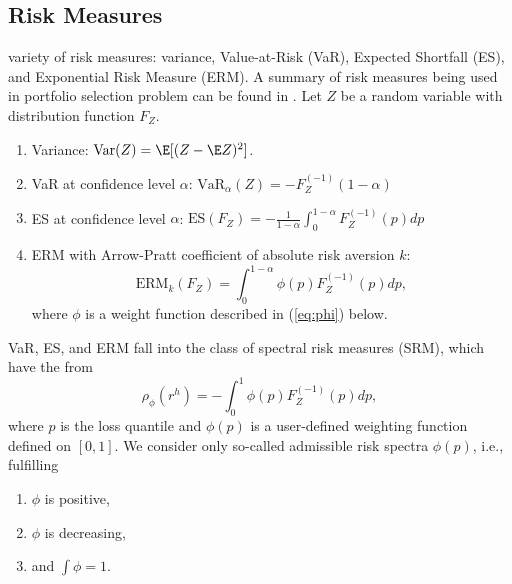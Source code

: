 \subsection{Risk Measures}\label{subsec:spectral-risk-measures}

 variety of risk measures: variance, Value-at-Risk (VaR), Expected Shortfall (ES), and Exponential Risk Measure (ERM).
A summary of risk measures being used in portfolio selection problem
can be found in \citet{hardle2008applied}.
 Let $Z$ be a random
variable with distribution function $F_Z$.
\begin{enumerate}
\item Variance: $\text{Var}(Z) = \E[(Z-\E Z)^2]$. 
\item VaR at confidence level $\alpha$: $\text{VaR}_\alpha(Z) = -F_{Z}^{(-1)}(1-\alpha)$
\item ES at confidence level $\alpha$: $\text{ES}(F_Z) = -\frac{1}{1-\alpha}\int_0^{1-\alpha}F_Z^{(-1)}(p)dp$
\item ERM with Arrow-Pratt coefficient of absolute risk
  aversion $k$:
  \begin{equation*}
    \text{ERM}_k(F_Z) = \int_0^{1-\alpha}\phi(p) F_Z^{(-1)}(p)dp,
  \end{equation*}
  where $\phi$ is a weight function described in (\ref{eq:phi}) below.
\end{enumerate}

VaR, ES, and ERM fall into the class of spectral risk measures (SRM),
which have the from \citep{Acerbi2002}%
\begin{equation*}
  \rho_\phi(r^h) = - \int_0^1 \phi(p) F_{Z}^{(-1)}(p)d p,
\end{equation*}
where $p$ is the loss quantile and $\phi(p)$ is a user-defined
weighting function defined on $[0,1]$.
We consider only so-called admissible risk spectra $\phi(p)$, i.e.,
fulfilling %
\begin{enumerate}[label=(\roman*)]
\item $\phi$ is positive,
\item $\phi$ is decreasing,
\item and $\int\phi=1$. 
\end{enumerate}

